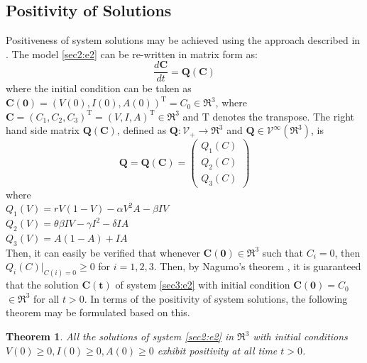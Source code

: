 \documentclass[12pt]{article}
\newtheorem{theorem}{Theorem}[section]
\numberwithin{equation}{section}
\begin{document}
\subsection{Positivity of Solutions}
Positiveness of system solutions may be achieved using the approach described in \cite{gakkhar2012control}. The model \eqref{sec2:e2} can be re-written in matrix form as:
\begin{equation}\label{sec3:e1}
\frac{d\mathbf{C}}{dt}=\mathbf{Q}(\mathbf{C})
\end{equation}
where the initial condition can be taken as $\mathbf{C(0)}=(V(0), I(0), A(0))^\mathrm{T}=C_{0}\in\Re^3$, where $\mathbf{C}=(C_1, C_2, C_3)^\mathrm{T}=(V,I,A)^\mathrm{T} \in\Re^3$ and  $\mathrm{T}$ denotes the transpose. The right hand side matrix $\mathbf{Q}(\mathbf{C})$, defined as $\mathbf{Q}: \mathcal{V_+}\rightarrow \Re^3$ and $\mathbf{Q}\in\mathcal{V}^{\infty}(\Re^3)$, is
\begin{equation} \label{sec3:e2}
\mathbf{Q}=\mathbf{Q}(\mathbf{C})=
\left({\begin{matrix}
Q_1(C)\\
Q_2(C)\\
Q_3(C)
\end{matrix}}\right)
\end{equation}
where \\
$Q_1(V)=rV(1-V)-\alpha V^2A - \beta IV$\\
$Q_2(V)=\theta \beta IV - \gamma I^2 - \delta IA$\\
$Q_3(V)=A(1-A)+IA$\\
Then, it can easily be verified that whenever $\mathbf{C(0)}\in\Re^3$ such that $C_{i}=0$, then $Q_{i}(C)|_{C(i)=0}\geq 0$ for $i=1,2,3$. Then, by Nagumo's theorem \cite{nagumo1942},  it is guaranteed that the solution $\mathbf{ C(t)}$ of system \eqref{sec3:e2} with initial condition $\mathbf{C(0)}=C_0$ $\in \Re^3 $ for all $t > 0$. In terms of the positivity of system solutions, the following theorem may be formulated based on this.
\begin{theorem}\label{Theorem 3.1}
All the solutions of system \eqref{sec2:e2} in $\Re^3$ with initial conditions $V(0) \geq 0, I(0)\geq 0, A(0)\geq 0$ exhibit positivity at all time $t>0$.
\end{theorem}
\end{document}
